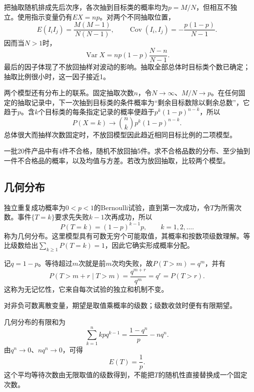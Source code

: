 把抽取随机排成先后次序，各次抽到目标类的概率均为\(p=M/N\)，但相互不独立。使用指示变量仍有\(EX=np\)。对两个不同抽取位置，
\[
 E(I_iI_j)=\frac{M(M-1)}{N(N-1)},\qquad
 \operatorname{Cov}(I_i,I_j)=-\frac{p(1-p)}{N-1}.
\]
因而当\(N>1\)时，
\begin{equation}\label{eq:prob-hypergeometric-variance}
 \operatorname{Var}X=np(1-p)\frac{N-n}{N-1}.
\end{equation}
最后的因子体现了不放回抽样对波动的影响。抽取全部总体时目标类个数已确定；抽取比例很小时，这一因子接近1。

两个模型还有分布上的联系。固定抽取次数\(n\)，令\(N\to\infty\)、\(M/N\to p\)。在任何固定的抽取记录中，下一次抽到目标类的条件概率为“剩余目标数除以剩余总数”，它趋于\(p\)。含\(k\)个目标类的每条指定记录的概率便趋于\(p^k(1-p)^{n-k}\)，所以
\[
 P(X=k)\longrightarrow\binom nkp^k(1-p)^{n-k}.
\]
总体很大而抽样次数固定时，不放回模型因此趋近相同目标比例的二项模型。

\begin{example}
一批20件产品中有4件不合格，随机不放回抽5件。求不合格品数的分布、至少抽到一件不合格品的概率，以及均值与方差。若改为放回抽取，比较两个模型。
\end{example}

\subsection{几何分布}

独立重复成功概率为\(0<p<1\)的Bernoulli试验，直到第一次成功，令\(T\)为所需次数。事件\(\{T=k\}\)要求先失败\(k-1\)次再成功，所以
\begin{equation}\label{eq:prob-geometric}
 P(T=k)=(1-p)^{k-1}p,\qquad k=1,2,\ldots.
\end{equation}
称为{\heiti 几何分布}。这里模型具有可数无穷个可能取值，其概率和按数项级数理解。等比级数给出\(\sum_{k\ge1}P(T=k)=1\)，因此它确实形成概率分配。

记\(q=1-p\)。等待超过\(m\)次就是前\(m\)次均失败，故\(P(T>m)=q^m\)，并有
\[
 P(T>m+r\mid T>m)=\frac{q^{m+r}}{q^m}=q^r=P(T>r).
\]
这称为{\heiti 无记忆性}，它来自每次试验的独立和机制不变。

对非负可数离散变量，期望是取值乘概率的级数；级数收敛时便有有限期望。

几何分布的有限和为
\[
 \sum_{k=1}^n k p q^{k-1}=\frac{1-q^n}{p}-nq^n.
\]
由\(q^n\to0\)、\(nq^n\to0\)，可得
\begin{equation}\label{eq:prob-geometric-mean}
 E(T)=\frac1p.
\end{equation}
这个平均等待次数由无限取值的级数得到，不能把\(T\)的随机性直接替换成一个固定次数。


